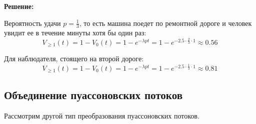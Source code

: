 \documentclass[aps,%
12pt,%
final,%
oneside,
onecolumn,%
musixtex, %
superscriptaddress,%
centertags]{article} %
\theoremstyle{plain}
\theoremstyle{definition}
\theoremstyle{remark}
\begin{document}
\textbf{Решение:}

Вероятность удачи $p = \frac{1}{3}$, то есть машина поедет по ремонтной дороге и человек увидит ее в течение минуты хотя бы один раз:
$$V_{\geq 1}(t) = 1 - V_0(t) = 1- e^{-\lambda p t} = 1 - e^{-2.5\cdot \frac{2}{3} \cdot 1} \approx 0.56$$

Для наблюдателя, стоящего на второй дороге:
$$V_{\geq 1}(t) = 1 - V_0(t) = 1- e^{-\lambda p t} = 1 - e^{-2.5\cdot \frac{1}{3} \cdot 1} \approx 0.81$$


\newpage
\subsection{Объединение пуассоновских потоков}

Рассмотрим другой тип преобразования пуассоновских потоков. 
\end{document}
